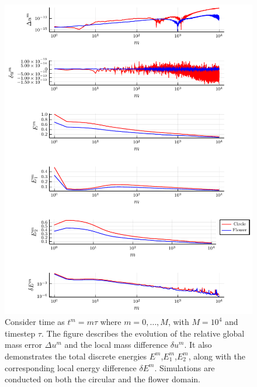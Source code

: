 \documentclass[11pt]{article}
\theoremstyle{remark}
\numberwithin{equation}{section}
\begin{document}
\begin{figure}[]
    \includegraphics{results/physical_CH_plot.pdf}
\caption{Consider time as $t^{m} = m\tau $ where $m= 0,\ldots, M $, with $M = 10^4$ and timestep $\tau $. The figure describes the evolution of the relative global mass error $\Delta u^m$ and the local mass difference $\delta u^m$. It also demonstrates the total discrete energies $E^m$,$E^m_{1}$,$E^m_{2}$, along with the corresponding local energy difference $\delta E^m$. Simulations are conducted on both the circular and the flower domain.}
    \label{fig:physical_CH_plot}
\end{figure}
\end{document}
